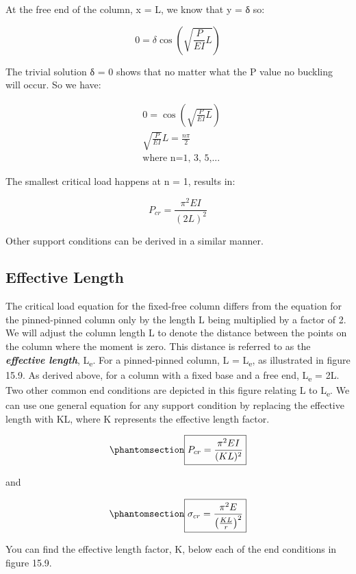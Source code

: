 \documentclass[
  letterpaper,
  DIV=11,
  numbers=noendperiod]{scrreprt}
\theoremstyle{definition}
\theoremstyle{remark}
\begin{document}
At the free end of the column, x = L, we know that y = δ so:

\[
0=\delta \cos \left(\sqrt{\frac{P}{E I} L}\right)
\]

The trivial solution δ = 0 shows that no matter what the P value no
buckling will occur. So we have:

\[
\begin{aligned}
& 0=\cos \left(\sqrt{\frac{P}{E I} L}\right) \\
& \sqrt{\frac{P}{E I}} L=\frac{n \pi}{2} \\
& \text{where n=1, 3, 5,...}
\end{aligned}
\]

The smallest critical load happens at n = 1, results in:

\[
P_{c r}=\frac{\pi^2 E I}{(2 L)^2}
\]

Other support conditions can be derived in a similar manner.

\subsection{Effective Length}\label{effective-length}

The critical load equation for the fixed-free column differs from the
equation for the pinned-pinned column only by the length L being
multiplied by a factor of 2. We will adjust the column length L to
denote the distance between the points on the column where the moment is
zero. This distance is referred to as the \textbf{\emph{effective
length}}, L\textsubscript{e}. For a pinned-pinned column, L =
L\textsubscript{e}, as illustrated in figure 15.9. As derived above, for
a column with a fixed base and a free end, L\textsubscript{e} = 2L. Two
other common end conditions are depicted in this figure relating L to
L\textsubscript{e}. We can use one general equation for any support
condition by replacing the effective length with KL, where K represents
the effective length factor.

\begin{equation}\phantomsection\label{eq-15.3}{
\boxed{P_{c r}=\frac{\pi^2 E I}{(K L)^2}}
}\end{equation}

and

\begin{equation}\phantomsection\label{eq-15.4}{
\boxed{\sigma_{c r}=\frac{\pi^2 E}{\left(\frac{K L}{r}\right)^2}}
}\end{equation}

You can find the effective length factor, K, below each of the end
conditions in figure 15.9.
\end{document}
